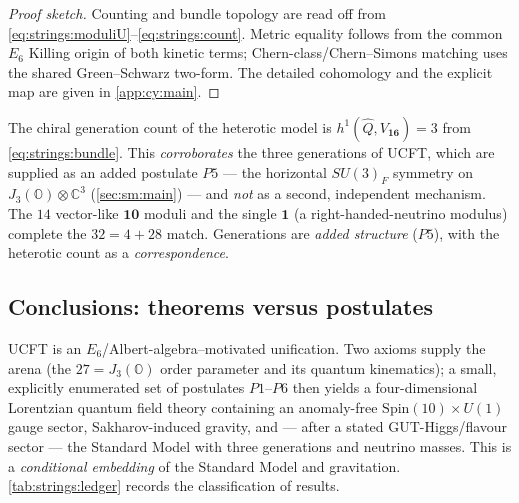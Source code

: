 \begin{proof}[Proof sketch]
Counting and bundle topology are read off from
\eqref{eq:strings:moduliU}--\eqref{eq:strings:count}. Metric equality
follows from the common $E_{6}$ Killing origin of both kinetic terms;
Chern-class/Chern--Simons matching uses the shared Green--Schwarz
two-form. The detailed cohomology and the explicit map are given in
\autoref{app:cy:main}.
\end{proof}

\begin{remark}
\label{rem:strings:gen}
The chiral generation count of the heterotic model is
$h^{1}(\widehat{Q},V_{\mathbf{16}})=3$ from \eqref{eq:strings:bundle}.
This \emph{corroborates} the three generations of UCFT, which are
supplied as an added postulate $P5$ --- the horizontal $SU(3)_{F}$
symmetry on $J_{3}(\mathbb{O})\otimes\mathbb{C}^{3}$
(\autoref{sec:sm:main}) --- and \emph{not} as a second, independent
mechanism. The $14$ vector-like $\mathbf{10}$ moduli and the single
$\mathbf{1}$ (a right-handed-neutrino modulus) complete the
$32=4+28$ match. Generations are \emph{added structure} ($P5$), with the
heterotic count as a \emph{correspondence}.
\end{remark}

\subsection{Conclusions: theorems versus postulates}
\label{sec:strings:conclusions}

UCFT is an $E_{6}$/Albert-algebra--motivated unification. Two axioms
supply the arena (the $27=J_{3}(\mathbb{O})$ order parameter and its
quantum kinematics); a small, explicitly enumerated set of postulates
$P1$--$P6$ then yields a four-dimensional Lorentzian quantum field theory
containing an anomaly-free $\mathrm{Spin}(10)\times U(1)$ gauge sector,
Sakharov-induced gravity, and --- after a stated GUT-Higgs/flavour sector
--- the Standard Model with three generations and neutrino masses. This
is a \emph{conditional embedding} of the Standard Model and gravitation.
\autoref{tab:strings:ledger} records the classification of results.

